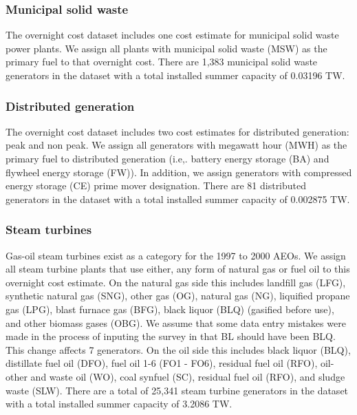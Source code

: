 \documentclass[10pt]{amsart}
\begin{document}
\subsubsection{Municipal solid waste}
The overnight cost dataset includes one cost estimate for municipal solid waste power plants.
We assign all plants with municipal solid waste (MSW) as the primary fuel to that overnight cost. 
There are 1,383 municipal solid waste generators in the dataset with a total installed summer capacity of  0.03196 TW. 

\subsubsection{Distributed generation}
The overnight cost dataset includes two cost estimates for distributed generation: peak and non peak.
We assign all generators with megawatt hour (MWH) as the primary fuel to distributed generation (i.e,. battery energy storage (BA) and flywheel energy storage (FW)). 
In addition, we assign generators with compressed energy storage (CE) prime mover designation.
There are 81 distributed generators in the dataset with a total installed summer capacity of 0.002875 TW. 

\subsubsection{Steam turbines}
Gas-oil steam turbines exist as a category for the 1997 to 2000 AEOs. 
We assign all steam turbine plants that use either, any form of natural gas or fuel oil to this overnight cost estimate. 
On the natural gas side this includes landfill gas (LFG), synthetic natural gas (SNG), other gas (OG), natural gas (NG), liquified propane gas (LPG), blast furnace gas (BFG), black liquor (BLQ) (gasified before use), and other biomass gases (OBG). 
We assume that some data entry mistakes were made in the process of inputing the survey in that BL should have been BLQ.
This change affects 7 generators.  
On the oil side this includes black liquor (BLQ), distillate fuel oil (DFO), fuel oil 1-6 (FO1 - FO6), residual fuel oil (RFO), oil-other and waste oil (WO), coal synfuel (SC), residual fuel oil (RFO), and sludge waste (SLW).
There are a total of 25,341 steam turbine generators in the dataset with a total installed summer capacity of 3.2086 TW.  
\end{document}
